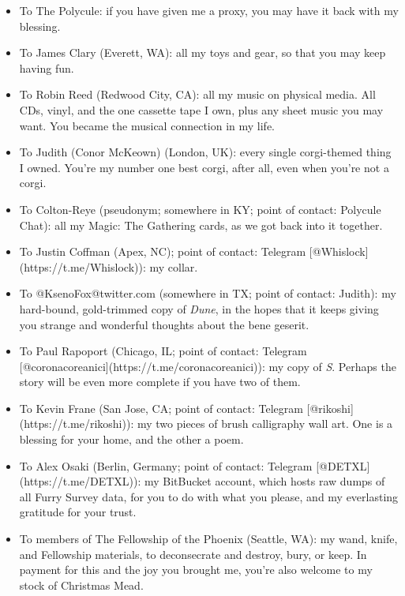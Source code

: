 \begin{enumerate}
  \begin{itemize}
  \tightlist
  \item
    To The Polycule: if you have given me a proxy, you may have it back with my blessing.
  \item
    To James Clary (Everett, WA): all my toys and gear, so that you may keep having fun.
  \item
    To Robin Reed (Redwood City, CA): all my music on physical media. All CDs, vinyl, and the one cassette tape I own, plus any sheet music you may want. You became the musical connection in my life.
  \item
    To Judith (Conor McKeown) (London, UK): every single corgi-themed thing I owned. You're my number one best corgi, after all, even when you're not a corgi.
  \item
    To Colton-Reye (pseudonym; somewhere in KY; point of contact: Polycule Chat): all my Magic: The Gathering cards, as we got back into it together.
  \item
    To Justin Coffman (Apex, NC); point of contact: Telegram {[}@Whislock{]}(https://t.me/Whislock)): my collar.
  \item
    To @KsenoFox@twitter.com (somewhere in TX; point of contact: Judith): my hard-bound, gold-trimmed copy of \emph{Dune}, in the hopes that it keeps giving you strange and wonderful thoughts about the bene geserit.
  \item
    To Paul Rapoport (Chicago, IL; point of contact: Telegram {[}@coronacoreanici{]}(https://t.me/coronacoreanici)): my copy of \emph{S}. Perhaps the story will be even more complete if you have two of them.
  \item
    To Kevin Frane (San Jose, CA; point of contact: Telegram {[}@rikoshi{]}(https://t.me/rikoshi)): my two pieces of brush calligraphy wall art. One is a blessing for your home, and the other a poem.
  \item
    To Alex Osaki (Berlin, Germany; point of contact: Telegram {[}@DETXL{]}(https://t.me/DETXL)): my BitBucket account, which hosts raw dumps of all Furry Survey data, for you to do with what you please, and my everlasting gratitude for your trust.
  \item
    To members of The Fellowship of the Phoenix (Seattle, WA): my wand, knife, and Fellowship materials, to deconsecrate and destroy, bury, or keep. In payment for this and the joy you brought me, you're also welcome to my stock of Christmas Mead.
  \end{itemize}
\end{enumerate}

